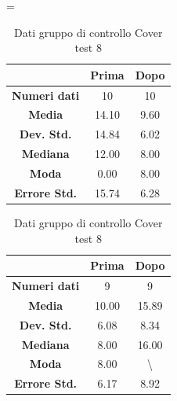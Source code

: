 \begin{table}
\centering
\setlength\tabcolsep{4pt}
\begin{minipage}{0.48\textwidth}
\centering
\tablewidth=\textwidth

\begin{tabular}{|c|c|c|} \hline
{\textbf{}} & {\textbf{  \hspace{8pt}Prima\hspace{8pt} }} & {\textbf{ \hspace{8pt}Dopo\hspace{8pt}  }}\\ \hline
\textbf{Numeri dati} & 10 & 10 \\ 
\textbf{Media} & 14.10 & 9.60 \\  
\textbf{Dev. Std.} & 14.84 & 6.02 \\  
\textbf{Mediana} & 12.00 & 8.00 \\ 
\textbf{Moda} & 0.00 & 8.00 \\ 
\textbf{Errore Std.} & 15.74 & 6.28 \\ 
\hline
\end{tabular}
\caption{Dati gruppo sperimentale Cover test 8}

\label{tab:accuracy} 
\end{minipage}%
\hfill
\begin{minipage}{0.48\textwidth}
\centering

\begin{tabular}{|c|c|c|} \hline
{\textbf{}} & {\textbf{  \hspace{8pt}Prima\hspace{8pt} }} & {\textbf{ \hspace{8pt}Dopo\hspace{8pt}  }}\\ \hline
\textbf{Numeri dati} & 9 & 9 \\ 
\textbf{Media} & 10.00 & 15.89 \\  
\textbf{Dev. Std.} & 6.08 & 8.34 \\  
\textbf{Mediana} & 8.00 & 16.00 \\  
\textbf{Moda} & 8.00 & \textbackslash \\
\textbf{Errore Std.} & 6.17 & 8.92 \\
\hline
\end{tabular}
\caption{Dati gruppo di controllo Cover test 8}

 \label{tab:ompdiff} 
\end{minipage}
\end{table}
